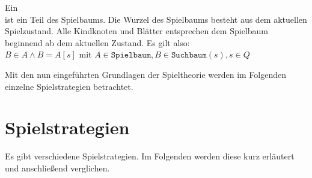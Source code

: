 \begin{Definition}
Ein  \\ist ein Teil des Spielbaums. Die Wurzel des Spielbaums besteht aus dem aktuellen Spielzustand. Alle Kindknoten und Blätter entsprechen dem Spielbaum beginnend ab dem aktuellen Zustand. Es gilt also:
\\ $B \in A \wedge B = A[s]$ mit $ A \in \mathtt{Spielbaum}, B \in \mathtt{Suchbaum}(s), s \in Q$
\end{Definition}
Mit den nun eingeführten Grundlagen der Spieltheorie werden im Folgenden einzelne Spielstrategien betrachtet. 
\newpage
\section{Spielstrategien}
Es gibt verschiedene Spielstrategien. Im Folgenden werden diese kurz erläutert und anschließend verglichen.

